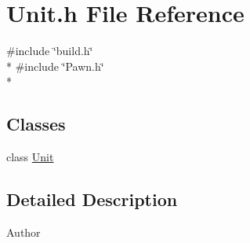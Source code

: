 \section{Unit.\-h File Reference}
\label{_unit_8h}
{\ttfamily \#include \char`\"{}build.\-h\char`\"{}}\\*
{\ttfamily \#include \char`\"{}Pawn.\-h\char`\"{}}\\*
\subsection*{Classes}
\begin{DoxyCompactItemize}
\item 
class \hyperlink{class_unit}{Unit}
\end{DoxyCompactItemize}


\subsection{Detailed Description}
\begin{DoxyAuthor}{Author}

\end{DoxyAuthor}
